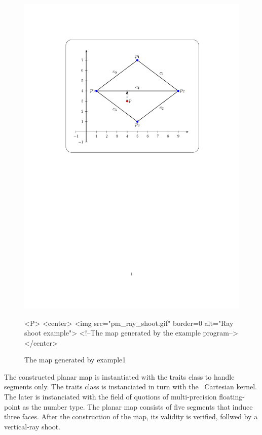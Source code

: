 \begin{figure}[h]
\begin{ccTexOnly}
    \centerline{
      \includegraphics{Planar_map/pm_ray_shoot}
    }
\end{ccTexOnly}

\caption{The map generated by example1
\label{PM_sec:shoot}}

\begin{ccHtmlOnly}
    <P>
    <center>
        <img src="pm_ray_shoot.gif"  border=0 alt="Ray shoot example">
        <!--The map generated by the example program-->
    </center>
\end{ccHtmlOnly}
\end{figure}

The constructed planar map is instantiated with the
 traits class to handle segments only.
The traits class is instanciated in turn with the \cgal\ Cartesian kernel.
The later is instanciated with the field of quotions of multi-precision
floating-point as the number type. The planar map consists of five segments
that induce three faces. After the construction of the map, its validity
is verified, follwed by a vertical-ray shoot.

